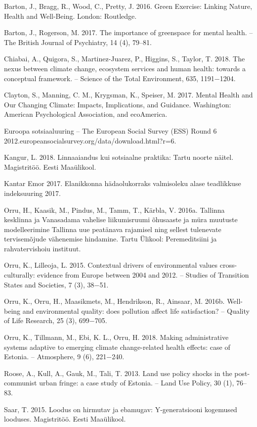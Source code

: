\documentclass[estonian,]{article}
\begin{document}
Barton, J., Bragg, R., Wood, C., Pretty, J. 2016. Green Exercise: Linking Nature, Health and Well-Being. London: Routledge.

Barton, J., Rogerson, M. 2017. The importance of greenspace for mental health. -- The British Journal of Psychiatry, 14 (4), 79--81.

Chiabai, A., Quigora, S., Martinez-Juarez, P., Higgins, S., Taylor, T. 2018. The nexus between climate change, ecosystem services and human health: towards a conceptual framework. -- Science of the Total Environment, 635, 1191−1204.

Clayton, S., Manning, C. M., Krygsman, K., Speiser, M. 2017. Mental Health and Our Changing Climate: Impacts, Implications, and Guidance. Washington: American Psychological Association, and ecoAmerica.

Euroopa sotsiaaluuring -- The European Social Survey (ESS) Round 6 2012.europeansocialsurvey.org/data/download.html?r=6.

Kangur, L. 2018. Linnaaiandus kui sotsiaalne praktika: Tartu noorte näitel. Magistritöö. Eesti Maaülikool.

Kantar Emor 2017. Elanikkonna hädaolukorraks valmisoleku alase teadlikkuse indeksuuring 2017.

Orru, H., Kaasik, M., Pindus, M., Tamm, T., Kärbla, V. 2016a. Tallinna kesklinna ja Vanasadama vahelise liikumisruumi õhusaaste ja müra muutuste modelleerimine Tallinna uue peatänava rajamisel ning sellest tulenevate tervisemõjude vähenemise hindamine. Tartu Ülikool: Peremeditsiini ja rahvatervishoiu instituut.

Orru, K., Lilleoja, L. 2015. Contextual drivers of environmental values cross-culturally: evidence from Europe between 2004 and 2012. -- Studies of Transition States and Societies, 7 (3), 38−51.

Orru, K., Orru, H., Maasikmets, M., Hendrikson, R., Ainsaar, M. 2016b. Well-being and environmental quality: does pollution affect life satisfaction? -- Quality of Life Research, 25 (3), 699−705.

Orru, K., Tillmann, M., Ebi, K. L., Orru, H. 2018. Making administrative systems adaptive to emerging climate change-related health effects: case of Estonia. -- Atmosphere, 9 (6), 221−240.

Roose, A., Kull, A., Gauk, M., Tali, T. 2013. Land use policy shocks in the post-communist urban fringe: a case study of Estonia. -- Land Use Policy, 30 (1), 76--83.

Saar, T. 2015. Loodus on hirmutav ja ebamugav: Y-generatsiooni kogemused looduses. Magistritöö. Eesti Maaülikool.
\end{document}
